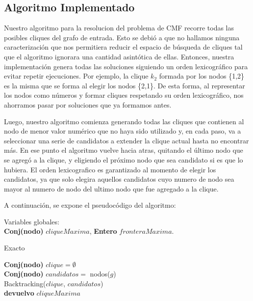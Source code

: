 \subsection{Algoritmo Implementado}

Nuestro algoritmo para la resolucion del problema de CMF recorre todas las posibles cliques del grafo de entrada. Esto se debió a que no hallamos ninguna caracterización que nos permitiera reducir el espacio de búsqueda de cliques tal que el algoritmo ignorara una cantidad asintótica de ellas. Entonces, nuestra implementación genera todas las soluciones siguiendo un orden lexicográfico para evitar repetir ejecuciones. Por ejemplo, la clique $k_{2}$ formada por los nodos \{1,2\} es la misma que se forma al elegir los nodos \{2,1\}. De esta forma, al representar los nodos como números y formar cliques respetando su orden lexicográfico, nos ahorramos pasar por soluciones que ya formamos antes. 

Luego, nuestro algoritmo comienza generando todas las cliques que contienen al nodo de menor valor numérico que no haya sido utilizado y, en cada paso, va a seleccionar una serie de candidatos a extender la clique actual hasta no encontrar más. En ese punto el algoritmo vuelve hacia atras, quitando el último nodo que se agregó a la clique, y eligiendo el próximo nodo que sea candidato si es que lo hubiera. El orden lexicografico es garantizado al momento de elegir los candidatos, ya que solo elegira aquellos candidatos cuyo numero de nodo sea mayor al numero de nodo del ultimo nodo que fue agregado a la clique.

A continuación, se expone el pseudocódigo del algoritmo:

Variables globales:\\
 \textbf{Conj(nodo)} $cliqueMaxima$, \textbf{Entero} $fronteraMaxima$.\\

\begin{algorithm}[H]
	\SetAlgoLined
	\caption{Exacto}

	\textbf{Conj(nodo)} $clique = \emptyset$\\
	\textbf{Conj(nodo)} $candidatos = $ nodos($g$)\\

	Backtracking($clique$, $candidatos$)\\

	\textbf{devuelvo} $cliqueMaxima$\\

\end{algorithm}

